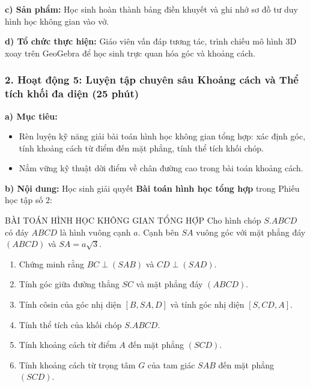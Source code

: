 \documentclass[12pt, a4paper]{article}
\begin{document}
\noindent \textbf{c) Sản phẩm:}
Học sinh hoàn thành bảng điền khuyết và ghi nhớ sơ đồ tư duy hình học không gian vào vở.

\noindent \textbf{d) Tổ chức thực hiện:} Giáo viên vấn đáp tương tác, trình chiếu mô hình 3D xoay trên GeoGebra để học sinh trực quan hóa góc và khoảng cách.

\subsubsection*{2. Hoạt động 5: Luyện tập chuyên sâu Khoảng cách và Thể tích khối đa diện (25 phút)}

\noindent \textbf{a) Mục tiêu:}
\begin{itemize}[leftmargin=0.6cm]
    \item Rèn luyện kỹ năng giải bài toán hình học không gian tổng hợp: xác định góc, tính khoảng cách từ điểm đến mặt phẳng, tính thể tích khối chóp.
    \item Nắm vững kỹ thuật dời điểm về chân đường cao trong bài toán khoảng cách.
\end{itemize}

\noindent \textbf{b) Nội dung:}
Học sinh giải quyết \textbf{Bài toán hình học tổng hợp} trong Phiếu học tập số 2:

\begin{pedabox}{BÀI TOÁN HÌNH HỌC KHÔNG GIAN TỔNG HỢP}
Cho hình chóp $S.ABCD$ có đáy $ABCD$ là hình vuông cạnh $a$. Cạnh bên $SA$ vuông góc với mặt phẳng đáy $(ABCD)$ và $SA = a\sqrt{3}$.
\begin{enumerate}[label=\alph*)]
    \item Chứng minh rằng $BC \perp (SAB)$ và $CD \perp (SAD)$.
    \item Tính góc giữa đường thẳng $SC$ và mặt phẳng đáy $(ABCD)$.
    \item Tính côsin của góc nhị diện $[B, SA, D]$ và tính góc nhị diện $[S, CD, A]$.
    \item Tính thể tích của khối chóp $S.ABCD$.
    \item Tính khoảng cách từ điểm $A$ đến mặt phẳng $(SCD)$.
    \item Tính khoảng cách từ trọng tâm $G$ của tam giác $SAB$ đến mặt phẳng $(SCD)$.
\end{enumerate}
\end{pedabox}
\end{document}

